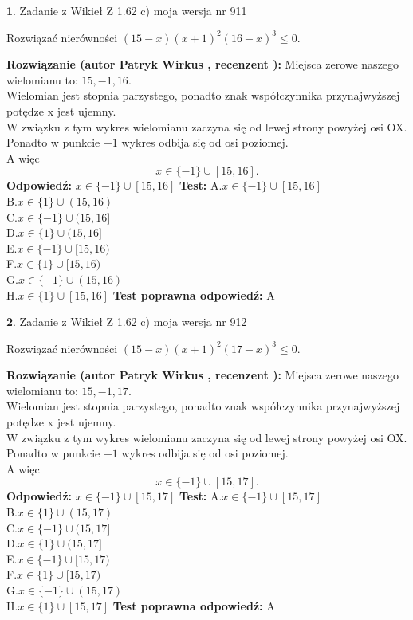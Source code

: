 \documentclass[12pt, a4paper]{article}
\theoremstyle{definition} %
\newtheorem{zad}{}
\newcommand{\zadStart}[1]{\begin{zad}#1\newline}
\newcommand{\zadStop}{\end{zad}}
\newcommand{\rozwStart}[2]{\noindent \textbf{Rozwiązanie (autor #1 , recenzent #2): }\newline}
\newcommand{\rozwStop}{\newline}
\newcommand{\odpStart}{\noindent \textbf{Odpowiedź:}\newline}
\newcommand{\odpStop}{\newline}
\newcommand{\testStart}{\noindent \textbf{Test:}\newline}
\newcommand{\testStop}{\newline}
\newcommand{\kluczStart}{\noindent \textbf{Test poprawna odpowiedź:}\newline}
\newcommand{\kluczStop}{\newline}
\begin{document}
\zadStart{Zadanie z Wikieł Z 1.62 c) moja wersja nr 911}

Rozwiązać nierówności $(15-x)(x+1)^{2}(16-x)^{3}\le0$.
\zadStop
\rozwStart{Patryk Wirkus}{}
Miejsca zerowe naszego wielomianu to: $15, -1, 16$.\\
Wielomian jest stopnia parzystego, ponadto znak współczynnika przy\linebreak najwyższej potędze x jest ujemny.\\ W związku z tym wykres wielomianu zaczyna się od lewej strony powyżej osi OX.\\
Ponadto w punkcie $-1$ wykres odbija się od osi poziomej.\\
A więc $$x \in \{-1\} \cup [15,16].$$
\rozwStop
\odpStart
$x \in \{-1\} \cup [15,16]$
\odpStop
\testStart
A.$x \in \{-1\} \cup [15,16]$\\
B.$x \in \{1\} \cup (15,16)$\\
C.$x \in \{-1\} \cup (15,16]$\\
D.$x \in \{1\} \cup (15,16]$\\
E.$x \in \{-1\} \cup [15,16)$\\
F.$x \in \{1\} \cup [15,16)$\\
G.$x \in \{-1\} \cup (15,16)$\\
H.$x \in \{1\} \cup [15,16]$
\testStop
\kluczStart
A
\kluczStop



\zadStart{Zadanie z Wikieł Z 1.62 c) moja wersja nr 912}

Rozwiązać nierówności $(15-x)(x+1)^{2}(17-x)^{3}\le0$.
\zadStop
\rozwStart{Patryk Wirkus}{}
Miejsca zerowe naszego wielomianu to: $15, -1, 17$.\\
Wielomian jest stopnia parzystego, ponadto znak współczynnika przy\linebreak najwyższej potędze x jest ujemny.\\ W związku z tym wykres wielomianu zaczyna się od lewej strony powyżej osi OX.\\
Ponadto w punkcie $-1$ wykres odbija się od osi poziomej.\\
A więc $$x \in \{-1\} \cup [15,17].$$
\rozwStop
\odpStart
$x \in \{-1\} \cup [15,17]$
\odpStop
\testStart
A.$x \in \{-1\} \cup [15,17]$\\
B.$x \in \{1\} \cup (15,17)$\\
C.$x \in \{-1\} \cup (15,17]$\\
D.$x \in \{1\} \cup (15,17]$\\
E.$x \in \{-1\} \cup [15,17)$\\
F.$x \in \{1\} \cup [15,17)$\\
G.$x \in \{-1\} \cup (15,17)$\\
H.$x \in \{1\} \cup [15,17]$
\testStop
\kluczStart
A
\kluczStop
\end{document}
